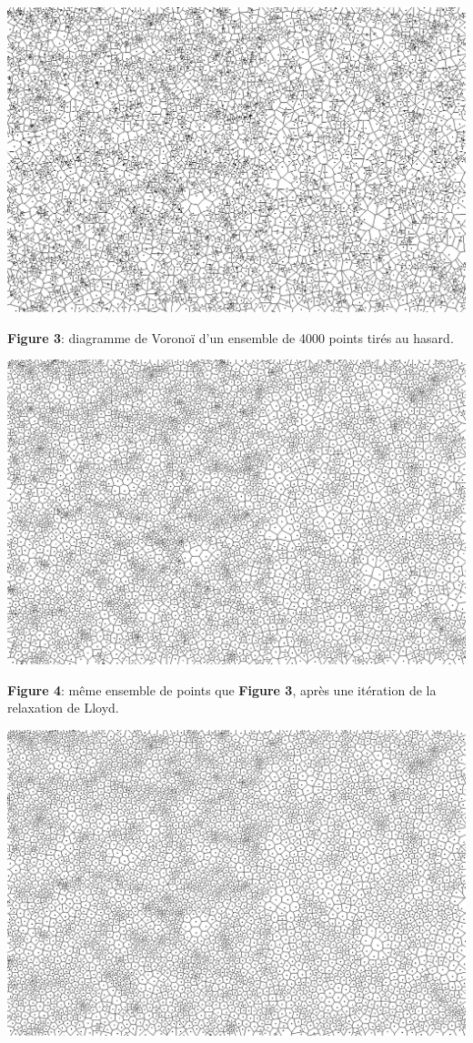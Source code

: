 \documentclass[a4paper, 10pt]{article}
\begin{document}
\begin{center}
\includegraphics[scale=0.3]{Lloyd0.png}
  
\textbf{Figure 3}: diagramme de Voronoï d'un ensemble de 4000 points tirés au hasard.  
  
\includegraphics[scale=0.3]{Lloyd1.png}
  
\textbf{Figure 4}: même ensemble de points que \textbf{Figure 3}, après une itération de la relaxation de Lloyd.  
  
\includegraphics[scale=0.3]{Lloyd2.png}
  

\end{center}
\end{document}
